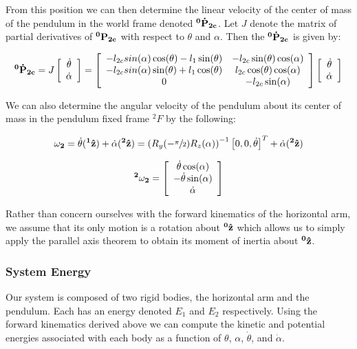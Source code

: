 \documentclass{article}
\theoremstyle{plain}
\theoremstyle{definition}
\theoremstyle{remark}
\begin{document}
From this position we can then determine the linear velocity of the center of mass of the pendulum in the world frame denoted $\bf{^0\dot{P}_{2c}}$.  Let $J$ denote the matrix of partial derivatives of $\bf{^0P_{2c}}$ with respect to $\theta$ and $\alpha$.  Then the $\bf{^0\dot{P}_{2c}}$ is given by:

$$ {\bf{^0\dot{P}_{2c}}} = J \left[ \begin{array}{c l} \dot{\theta} \\ \dot{\alpha} \end{array} \right] = \left[ \begin{array}{c c l} 
	-l_{2c} sin(\alpha) \cos(\theta) - l_{1} \sin(\theta)  &  -l_{2c} \sin(\theta) \cos(\alpha) \\
	-l_{2c} sin(\alpha) \sin(\theta) + l_1 \cos(\theta) & l_{2c} \cos(\theta) \cos(\alpha) \\
	0 & -l_{2c} \sin(\alpha) \\ \end{array} \right] \left[ \begin{array}{c l} \dot{\theta} \\ \dot{\alpha} \end{array} \right]$$

We can also determine the angular velocity of the pendulum about its center of mass in the pendulum fixed frame $^2F$  by the following:

$$ {\bf{\omega_{2}}}= \dot{\theta} ({\bf{^1\hat{z}}}) + \dot{\alpha}({\bf{^2\hat{z}}})  = \left( R_{y}(-\sfrac{\pi}{2}) R_{z}(\alpha)\right)^{-1} \left[ 0, 0, \dot{\theta} \right]^T + \dot{\alpha}({\bf{^2\hat{z}}})$$

$$  {\bf{^2\omega_{2}}}= \left[ \begin{array}{c l}   \dot{\theta} \cos(\alpha) \\ -\dot{\theta} \sin(\alpha) \\ \dot{\alpha} \end{array} \right]$$

Rather than concern ourselves with the forward kinematics of the horizontal arm, we assume that its only motion is a rotation about $\bf{^0\hat{z}}$ which allows us to simply apply the parallel axis theorem to obtain its moment of inertia about $\bf{^0\hat{z}}$.


\subsubsection*{System Energy}

Our system is composed of two rigid bodies, the horizontal arm and the pendulum.  Each has an energy denoted $E_1$ and $E_2$ respectively.  Using the forward kinematics derived above we can compute the kinetic and potential energies associated with each body as a function of $\theta$, $\alpha$, $\dot{\theta}$, and $\dot{\alpha}$.
\end{document}
